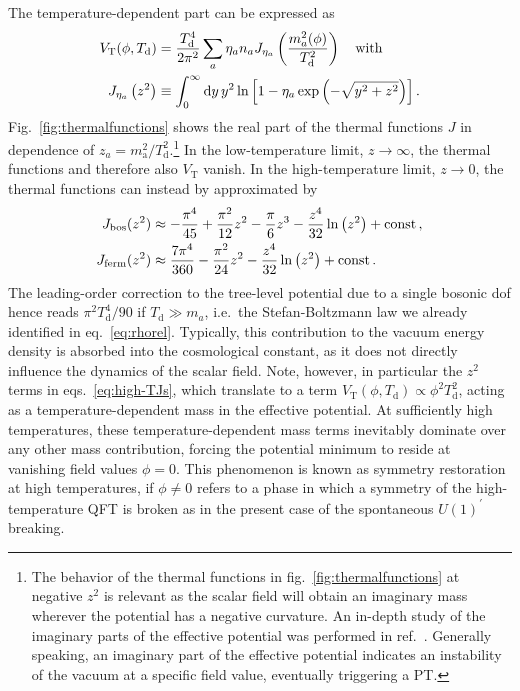 The temperature-dependent part can be expressed as
\begin{align}
	V_\text{T}(\phi, T_\text{d})& = \frac{T^4_\text{d}}{2  \pi^2} \sum_a \eta_a  n_a  J_{\eta_a}\left( \frac{m_a^2(\phi)}{T^2_\text{d}} \right) \quad \text{with} \\
	J_{\eta_a}\left( z^2 \right) &\equiv \int_{0}^{\infty} \mathop{}\!\mathrm{d} y \,  y^2 \ln \left[ 1 - \eta_a  \exp \left( - \sqrt{y^2 + z^2} \right) \right] .
	\label{eq:thermalfunction}
\end{align}
Fig.~\ref{fig:thermalfunctions} shows the real part of the thermal functions $J$ in dependence of $z_a = m^2_\mathrm{a}/T_\mathrm{d}^2$.\footnote{The behavior of the thermal functions in fig.~\ref{fig:thermalfunctions} at negative $z^2$ is relevant as the scalar field will obtain an imaginary mass wherever the potential has a negative curvature. An in-depth study of the imaginary parts of the effective potential was performed in ref.~\cite{Delaunay:2007wb}. Generally speaking, an imaginary part of the effective potential indicates an instability of the vacuum at a specific field value, eventually triggering a \ac{PT}. } In the low-temperature limit, $z \rightarrow \infty$, the thermal functions and therefore also $V_\text{T}$ vanish. In the high-temperature limit, $z \rightarrow 0$, the thermal functions can instead by approximated by~\cite{Quiros:1999jp}
\begin{subequations}
	\label{eq:high-TJs}
	\begin{align}
		J_\text{bos}(z^2) &\approx - \frac{\pi^4}{45} + \frac{\pi^2}{12} z^2 - \frac{\pi}{6} z^3 - \frac{z^4}{32} \ln \left( z^2 \right) + \text{const}\, , \label{eq:high-TJbos}\\
		J_\text{ferm}(z^2) &\approx \frac{7 \pi^4}{360} - \frac{\pi^2}{24} z^2 - \frac{z^4}{32} \ln \left( z^2 \right) + \text{const}\, .
	\end{align}
\end{subequations}
The leading-order correction to the tree-level potential due to a single bosonic \ac{dof} hence reads $\pi^2 T^4_\text{d} /90$ if $T_\text{d} \gg m_a$, i.e.~the Stefan-Boltzmann law we already identified in eq.~\eqref{eq:rhorel}.  Typically, this contribution to the vacuum energy density is absorbed into the cosmological constant, as it does not directly influence the dynamics of the scalar field. Note, however, in particular the $z^2$ terms in eqs.~\eqref{eq:high-TJs}, which translate to a term $V_\text{T}(\phi, T_\text{d}) \propto \phi^2 T^2_\text{d}$, acting as a temperature-dependent mass in the effective potential. At sufficiently high temperatures, these temperature-dependent mass terms inevitably  dominate over any other mass contribution, forcing the potential minimum to reside at vanishing field values $\phi = 0$. This phenomenon is known as symmetry restoration at high temperatures, if $\phi \neq 0$ refers to a phase in which a symmetry of the high-temperature \ac{QFT} is broken as in the present case of the spontaneous $U(1)^\prime$ breaking.

